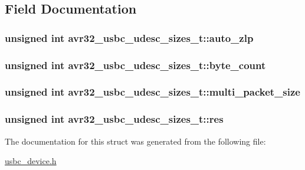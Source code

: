 \subsection{\-Field \-Documentation}
\hypertarget{structavr32__usbc__udesc__sizes__t_aa8c8fab669dcb353291171bc2a1ec2c1}{
\subsubsection[{auto\-\_\-zlp}]{\setlength{\rightskip}{0pt plus 5cm}unsigned int {\bf avr32\-\_\-usbc\-\_\-udesc\-\_\-sizes\-\_\-t\-::auto\-\_\-zlp}}}
\label{structavr32__usbc__udesc__sizes__t_aa8c8fab669dcb353291171bc2a1ec2c1}
\hypertarget{structavr32__usbc__udesc__sizes__t_aa8eaa8ddccbedd07f1ea52402e9926cc}{
\subsubsection[{byte\-\_\-count}]{\setlength{\rightskip}{0pt plus 5cm}unsigned int {\bf avr32\-\_\-usbc\-\_\-udesc\-\_\-sizes\-\_\-t\-::byte\-\_\-count}}}
\label{structavr32__usbc__udesc__sizes__t_aa8eaa8ddccbedd07f1ea52402e9926cc}
\hypertarget{structavr32__usbc__udesc__sizes__t_ae026c9f636627d65b351846c0068a916}{
\subsubsection[{multi\-\_\-packet\-\_\-size}]{\setlength{\rightskip}{0pt plus 5cm}unsigned int {\bf avr32\-\_\-usbc\-\_\-udesc\-\_\-sizes\-\_\-t\-::multi\-\_\-packet\-\_\-size}}}
\label{structavr32__usbc__udesc__sizes__t_ae026c9f636627d65b351846c0068a916}
\hypertarget{structavr32__usbc__udesc__sizes__t_aee49c3bdbca6c637246f1ae3f605ea9e}{
\subsubsection[{res}]{\setlength{\rightskip}{0pt plus 5cm}unsigned int {\bf avr32\-\_\-usbc\-\_\-udesc\-\_\-sizes\-\_\-t\-::res}}}
\label{structavr32__usbc__udesc__sizes__t_aee49c3bdbca6c637246f1ae3f605ea9e}


\-The documentation for this struct was generated from the following file\-:\begin{DoxyCompactItemize}
\item 
\hyperlink{usbc__device_8h}{usbc\-\_\-device.\-h}\end{DoxyCompactItemize}

